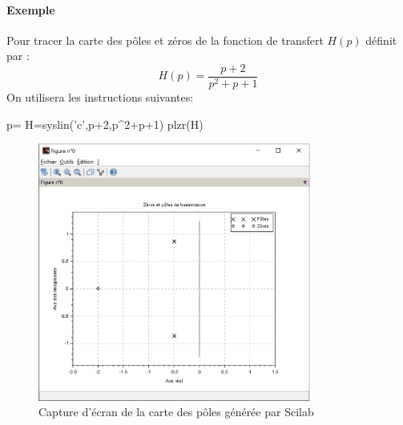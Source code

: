 \paragraph{Exemple}
Pour tracer la carte des pôles et zéros de la fonction de transfert $H(p)$ 
définit par :
$$
H(p)=\dfrac{p+2}{p^2+p+1}
$$
On utilisera les instructions suivantes:
\begin{Scilabcode}
p=%
H=syslin('c',p+2,p^2+p+1)
plzr(H)
\end{Scilabcode}
\begin{figure}
    \centering
    \includegraphics[width=0.8\textwidth]{fig/capture_SCILAB-plzr.eps}
    \caption{Capture d'écran de la carte des pôles générée par Scilab}
\end{figure}
